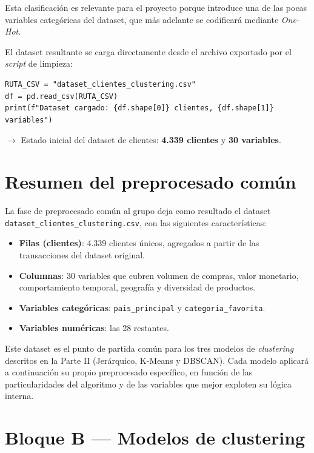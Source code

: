 \documentclass[11pt,a4paper]{article}
\begin{document}
\noindent Esta clasificación es relevante para el proyecto porque introduce una de las pocas variables categóricas del dataset, que más adelante se codificará mediante \textit{One-Hot}.

El dataset resultante se carga directamente desde el archivo exportado por el \textit{script} de limpieza:

\begin{lstlisting}
RUTA_CSV = "dataset_clientes_clustering.csv"
df = pd.read_csv(RUTA_CSV)
print(f"Dataset cargado: {df.shape[0]} clientes, {df.shape[1]} variables")
\end{lstlisting}

\noindent$\rightarrow$ Estado inicial del dataset de clientes: \textbf{4.339 clientes} y \textbf{30 variables}.


\section{Resumen del preprocesado común}

La fase de preprocesado común al grupo deja como resultado el dataset \texttt{dataset\_clientes\_clustering.csv}, con las siguientes características:

\begin{itemize}
    \item \textbf{Filas (clientes)}: 4.339 clientes únicos, agregados a partir de las transacciones del dataset original.
    \item \textbf{Columnas}: 30 variables que cubren volumen de compras, valor monetario, comportamiento temporal, geografía y diversidad de productos.
    \item \textbf{Variables categóricas}: \texttt{pais\_principal} y \texttt{categoria\_favorita}.
    \item \textbf{Variables numéricas}: las 28 restantes.
\end{itemize}

Este dataset es el punto de partida común para los tres modelos de \textit{clustering} descritos en la Parte II (Jerárquico, K-Means y DBSCAN). Cada modelo aplicará a continuación su propio preprocesado específico, en función de las particularidades del algoritmo y de las variables que mejor exploten su lógica interna.

\section*{\textcolor{tealtfm}{Bloque B — Modelos de clustering}}
\end{document}
